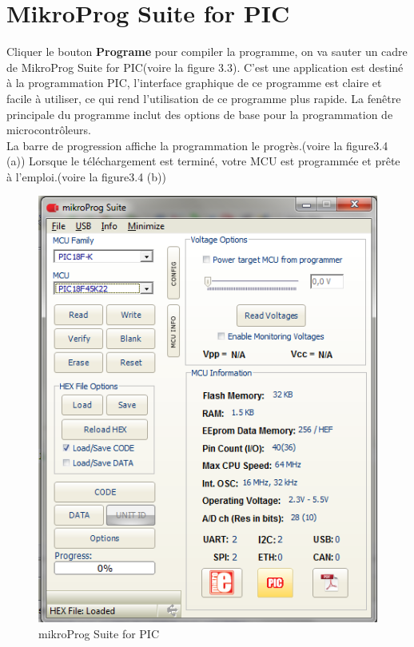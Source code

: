 \documentclass[a4paper, 12pt]{book}
\newcounter{program}[subsection]
\begin{document}
\section{MikroProg Suite for PIC}
Cliquer le bouton \textbf{Programe} pour compiler la programme, on va sauter un cadre de MikroProg Suite for PIC(voire la figure 3.3). C’est une application est destiné à la programmation PIC, l'interface graphique de ce programme est claire et facile à utiliser, ce qui rend l’utilisation de ce programme plus rapide. La fenêtre principale du programme inclut des options de base pour la programmation de microcontrôleurs.\\

La barre de progression affiche la programmation le progrès.(voire la figure3.4 (a))
Lorsque le téléchargement est terminé, votre MCU est programmée et prête à l’emploi.(voire la figure3.4 (b))\\
\begin{figure}[htbp]
  \centering
  \includegraphics[width=0.5\linewidth]{images/mikroProg_Suite.png}
  \caption{mikroProg Suite for PIC\label{fig-bmp}}
\end{figure} 
\end{document}

